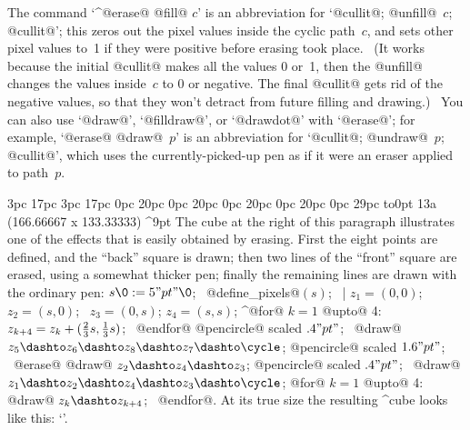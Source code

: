 {{{{\danger The command `^@erase@ @fill@ $c$' is an abbreviation for
`@cullit@; @unfill@~$c$; @cullit@'; this zeros out the pixel values inside
the cyclic path~$c$, and sets other pixel values to~1 if they were positive
before erasing took place. \ (It works because the initial @cullit@ makes
all the values 0 or~1, then the @unfill@ changes the values inside~$c$
to 0 or negative. The final @cullit@ gets rid of the negative values,
so that they won't detract from future filling and drawing.) \ You can
also use `@draw@', `@filldraw@', or `@drawdot@' with `@erase@'; for example,
`@erase@ @draw@~$p$' is an abbreviation for `@cullit@; @undraw@~$p$;
@cullit@', which uses the currently-picked-up pen as if it were an
eraser applied to path~$p$.

{\ninepoint
\medbreak
{} 3pc 17pc 3pc 17pc
0pc 20pc 0pc 20pc 0pc 20pc 0pc 20pc 0pc 29pc
\noindent
\hbox to0pt{\hskip-3pc\dbend\hfill}%
\rightfig 13a ({166.66667\apspix} x {133.33333\apspix}) ^9pt
The cube at the right of this paragraph illustrates one of the effects that
is easily obtained by erasing. First the eight points are defined, and
the ``back'' square is drawn; then two lines of the ``front'' square are
erased, using a somewhat thicker pen; finally the remaining lines are
drawn with the ordinary pen:
\begindisplay
$s\0:=5"pt"\0$; \ @define\_pixels@$(s)$; \ |%
$z_1=(0,0)$; \ $z_2=(s,0)$; \ $z_3=(0,s)$; $z_4=(s,s)$;\cr
^@for@ $k=1$ @upto@ 4: $z_{k+4}=z_k+({2\over3}s,{1\over3}s)$; \ @endfor@\cr
\pickup @pencircle@ scaled $.4"pt"$; \
@draw@ $z_5\dashto z_6\dashto z_8\dashto z_7\dashto \cycle$;\cr
\pickup @pencircle@ scaled $1.6"pt"$; \
@erase@ @draw@ $z_2\dashto z_4\dashto z_3$;\cr
\pickup @pencircle@ scaled $.4"pt"$; \
@draw@ $z_1\dashto z_2\dashto z_4\dashto z_3\dashto \cycle$;\cr
@for@ $k=1$ @upto@ 4: @draw@ $z_k\dashto z_{k+4}$; \ @endfor@.\cr
\enddisplay
At its true size the resulting ^{cube} looks like this:
`\thinspace{\manual\cubea}\thinspace'.\par}

}}}}

